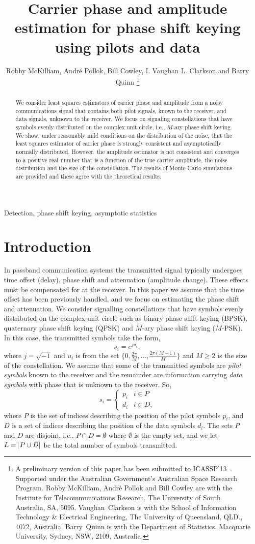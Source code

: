 \documentclass[journal]{IEEEtran}
\title{Carrier phase and amplitude estimation for phase shift keying using pilots and data}
\author{Robby McKilliam, Andr\'{e} Pollok, Bill Cowley, I. Vaughan L. Clarkson and Barry Quinn  
\thanks{
A preliminary version of this paper has been submitted to ICASSP'13~\cite{McKilliam_leastsqPSKnoncoICASSP_2012}.  Supported under the Australian Government’s Australian Space Research Program.
Robby McKilliam, Andr\'{e} Pollok and Bill Cowley are with the Institute for Telecommunications Research, The University of South Australia, SA, 5095.  Vaughan~Clarkson is with the School of Information Technology \& Electrical Engineering, The University of Queensland, QLD., 4072, Australia.  Barry~Quinn is with the Department of Statistics, Macquarie University, Sydney, NSW, 2109, Australia.
}}
\begin{document}
\maketitle

\begin{abstract}
We consider least squares estimators of carrier phase and amplitude from a noisy communications signal that contains both pilot signals, known to the receiver, and data signals, unknown to the receiver.  We focus on signaling constellations that have symbols evenly distributed on the complex unit circle, i.e., $M$-ary phase shift keying.  We show, under reasonably mild conditions on the distribution of the noise, that the least squares estimator of carrier phase is strongly consistent and asymptotically normally distributed.  However, the amplitude estimator is not consistent and converges to a positive real number that is a function of the true carrier amplitude, the noise distribution and the size of the constellation.  %
The results of Monte Carlo simulations are provided and these agree with the theoretical results.   
\end{abstract}
\begin{IEEEkeywords}
Detection, phase shift keying, asymptotic statistics
\end{IEEEkeywords}

\section{Introduction}

In passband communication systems the transmitted signal typically undergoes time offset (delay), phase shift and attenuation (amplitude change).  These effects must be compensated for at the receiver. In this paper we assume that the time offset has been previously handled, and we focus on estimating the phase shift and attenuation.  We consider signalling constellations that have symbols evenly distributed on the complex unit circle such as binary phase shift keying (BPSK), quaternary phase shift keying (QPSK) and $M$-ary phase shift keying ($M$-PSK).  In this case, the transmitted symbols take the form,
\[
s_i = e^{j u_i},
\]
where $j = \sqrt{-1}$ and $u_i$ is from the set $\{0, \tfrac{2\pi}{M}, \dots, \tfrac{2\pi(M-1)}{M}\}$ and $M \geq 2$ is the size of the constellation.  We assume that some of the transmitted symbols are \emph{pilot symbols} known to the receiver and the remainder are information carrying \emph{data symbols} with phase that is unknown to the receiver.  So,
\[
s_i = \begin{cases}
p_i & i \in P \\
d_i & i \in D,
\end{cases}
\]
where $P$ is the set of indices describing the position of the pilot symbols $p_i$, and $D$ is a set of indices describing the position of the data symbols $d_i$.  The sets $P$ and $D$ are disjoint, i.e., $P \cap D = \emptyset$  where $\emptyset$ is the empty set, and we let $L = {\left\vert P \cup D \right\vert}$ be the total number of symbols transmitted.
\end{document}
